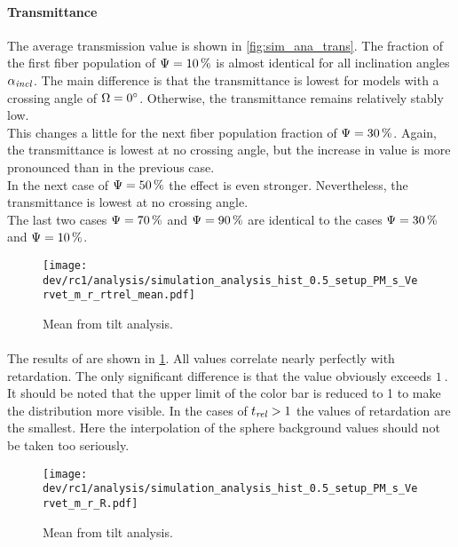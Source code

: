 \paragraph{Transmittance}
The average transmission value is shown in \cref{fig:sim_ana_trans}.
The fraction of the first fiber population of $\textnormal{$\Psi$}=\SI{10}{\percent}$ is almost identical for all inclination angles $\textnormal{$\alpha_{\mathit{incl}}$}$.
The main difference is that the transmittance is lowest for models with a crossing angle of $\textnormal{$\Omega$} = \SI{0}{\degree}$.
Otherwise, the transmittance remains relatively stably low.
\\
%
This changes a little for the next fiber population fraction of $\textnormal{$\Psi$}=\SI{30}{\percent}$.
Again, the transmittance is lowest at no crossing angle, but the increase in value is more pronounced than in the previous case.
\\
%
In the next case of $\textnormal{$\Psi$}=\SI{50}{\percent}$ the effect is even stronger.
Nevertheless, the transmittance is lowest at no crossing angle.
\\
%
The last two cases $\textnormal{$\Psi$}=\SI{70}{\percent}$ and $\textnormal{$\Psi$}=\SI{90}{\percent}$ are identical to the cases $\textnormal{$\Psi$}=\SI{30}{\percent}$ and $\textnormal{$\Psi$}=\SI{10}{\percent}$.
%
%
%
\begin{figure}[!p]
\centering
\texttt{[image: dev/rc1/analysis/simulation\_analysis\_hist\_0.5\_setup\_PM\_s\_Vervet\_m\_r\_rtrel\_mean.pdf]}
\caption[Simulation \trel{}]{Mean \trel{} from tilt analysis.}
\label{fig:sim_ana_trel}
\end{figure}
%
\paragraph{\trel}
The results of \trel{} are shown in \cref{fig:sim_ana_trel}.
All values correlate nearly perfectly with retardation.
The only significant difference is that the \trel{} value obviously exceeds $\SI{1}{}$.
It should be noted that the upper limit of the color bar is reduced to 1 to make the distribution more visible.
In the cases of $\textnormal{$t_\mathit{rel}$} > \SI{1}{}$ the values of retardation are the smallest.
Here the interpolation of the sphere background values should not be taken too seriously.
%
%
%
\begin{figure}[!p]
\centering
\texttt{[image: dev/rc1/analysis/simulation\_analysis\_hist\_0.5\_setup\_PM\_s\_Vervet\_m\_r\_R.pdf]}
\caption[Simulation \rvalue]{Mean \rvalue{} from tilt analysis.}
\label{fig:sim_ana_rvalue}
\end{figure}
%
